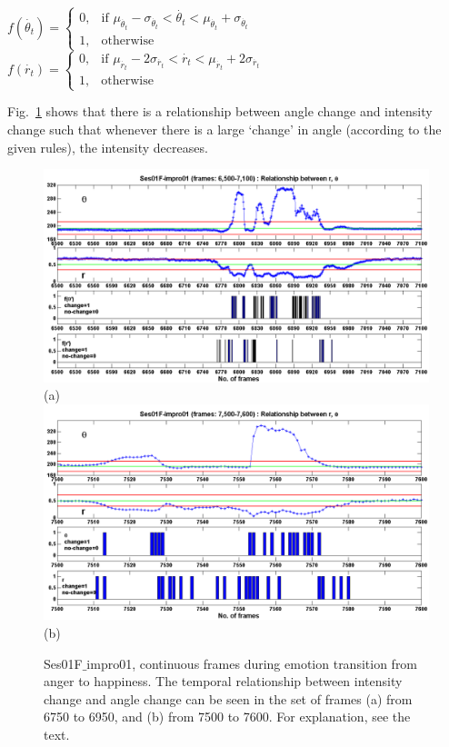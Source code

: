 \documentclass[10pt,journal,cspaper,compsoc]{IEEEtran}
\begin{document}
\begin{center}
$f(\dot{\theta_{t}}) = \left\{ \begin{array}{ll}
0, 	&	 \text{if } \mu_{\dot{\theta_{t}}}-\sigma_{\dot{\theta_{t}}}<\dot{\theta_{t}}<\mu_{\dot{\theta_{t}}}+\sigma_{\dot{\theta_{t}}} \\ 
1, 	&	 \text{otherwise}
\end{array}\right.$ \\
$f(\dot{r_{t}}) = \left\{ \begin{array}{ll}
0, 	&	 \text{if } \mu_{\dot{r_{t}}}-2\sigma_{\dot{r_{t}}}<\dot{r_{t}}<\mu_{\dot{r_{t}}}+2\sigma_{\dot{r_{t}}} \\ 
1, 	&	 \text{otherwise}
\end{array}\right.$
\end{center}

Fig.~\ref{fig_controlchart} shows that there is a relationship between angle change and intensity change such that whenever there is a large `change' in angle (according to the given rules), the intensity decreases.

\begin{figure}[!t]
\begin{center}
{
\centering
\includegraphics[width=1\textwidth]{figures/Ch7/6750_6950_change_1.png} (a)
}
\\
{
\centering
\includegraphics[width=1\textwidth]{figures/Ch7/7500_7600_change.png} (b)
}
\end{center}
\caption{Ses01F$\_$impro01, continuous frames during emotion transition from anger to happiness. The temporal relationship between intensity change and angle change can be seen in the set of frames (a) from 6750 to 6950, and (b) from 7500 to 7600. For explanation, see the text.}
\label{fig_controlchart}
\end{figure}
\end{document}
